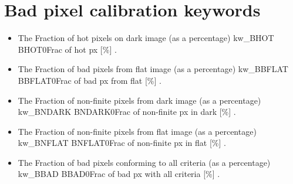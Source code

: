 \section{Bad pixel calibration keywords}
\label{ch:output_keywords:badpix}

\begin{itemize}

	\item {}
	{The Fraction of hot pixels on dark image (as a percentage)}
	{kw\_BHOT}
	{BHOT}{0}{Frac of hot px [\%]}
	{\calbadpix}{\spirouKeywords}{\calbadpix.\progMAIN}


	\item {}
	{The Fraction of bad pixels from flat image (as a percentage)}
	{kw\_BBFLAT}
	{BBFLAT}{0}{Frac of bad px from flat [\%]}
	{\calbadpix}{\spirouKeywords}{\calbadpix.\progMAIN}


	\item {}
	{The Fraction of non-finite pixels from dark image (as a percentage)}
	{kw\_BNDARK}
	{BNDARK}{0}{Frac of non-finite px in dark [\%]}
	{\calbadpix}{\spirouKeywords}{\calbadpix.\progMAIN}


	\item {}
	{The Fraction of non-finite pixels from flat image (as a percentage)}
	{kw\_BNFLAT}
	{BNFLAT}{0}{Frac of non-finite px in flat [\%]}
	{\calbadpix}{\spirouKeywords}{\calbadpix.\progMAIN}


	\item {}
	{The Fraction of bad pixels conforming to all criteria (as a percentage)}
	{kw\_BBAD}
	{BBAD}{0}{Frac of bad px with all criteria [\%]}
	{\calbadpix}{\spirouKeywords}{\calbadpix.\progMAIN}

\end{itemize}